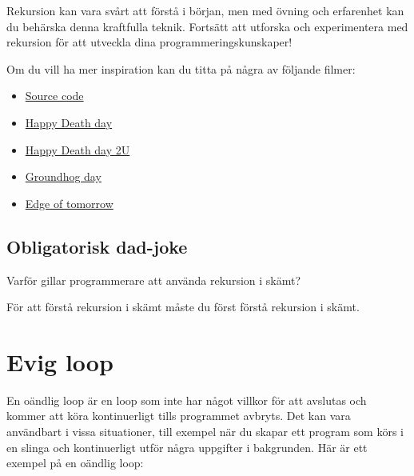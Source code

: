 Rekursion kan vara svårt att förstå i början, men med övning och
erfarenhet kan du behärska denna kraftfulla teknik. Fortsätt att
utforska och experimentera med rekursion för att utveckla dina
programmeringskunskaper!

Om du vill ha mer inspiration kan du titta på några av följande filmer:

\begin{itemize}
\tightlist
\item
  \href{https://www.imdb.com/title/tt0945513/}{Source code}
\item
  \href{https://www.imdb.com/title/tt5308322/}{Happy Death day}
\item
  \href{https://www.imdb.com/title/tt8155288/}{Happy Death day 2U}
\item
  \href{https://www.imdb.com/title/tt0107048/}{Groundhog day}
\item
  \href{https://www.imdb.com/title/tt1631867/}{Edge of tomorrow}
\end{itemize}

\hypertarget{obligatorisk-dad-joke}{%
\subsection{Obligatorisk dad-joke}\label{obligatorisk-dad-joke}}

Varför gillar programmerare att använda rekursion i skämt?

För att förstå rekursion i skämt måste du först förstå rekursion i
skämt.

\hypertarget{evig-loop}{%
\section{Evig loop}\label{evig-loop}}

En oändlig loop är en loop som inte har något villkor för att avslutas
och kommer att köra kontinuerligt tills programmet avbryts. Det kan vara
användbart i vissa situationer, till exempel när du skapar ett program
som körs i en slinga och kontinuerligt utför några uppgifter i
bakgrunden. Här är ett exempel på en oändlig loop:

\hypertarget{cb1}{}
\begin{Shaded}
\begin{Highlighting}[]
 \OperatorTok{(}\OperatorTok{)} \OperatorTok{\{}
\OperatorTok{\}}
\end{Highlighting}
\end{Shaded}

